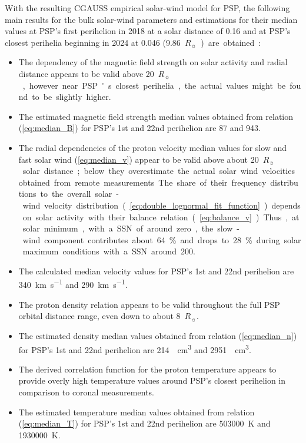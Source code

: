 \documentclass[]{aa}
\newcommand{\Rs}{$R_\sun{}$}
\begin{document}
        With the resulting CGAUSS empirical solar-wind model for PSP, the following main results for the bulk solar-wind parameters and estimations for their median values at PSP’s first perihelion in 2018 at a solar distance of \SI{0.16}{\au} and at PSP’s closest perihelia beginning in 2024 at \SI{0.046}{\au} (\SI{9.86}{\Rs}) are obtained:
        \begin{itemize}
                \item The dependency of the magnetic field strength on solar activity and radial distance appears to be valid above \SI{20}{\Rs}, however near PSP's closest perihelia, the actual values might be found to be slightly higher.
                \item The estimated magnetic field strength median values obtained from relation (\ref{eq:median_B}) for PSP's 1st and 22nd perihelion are \SI{87}{\nT} and \SI{943}{\nT}.
                \item The radial dependencies of the proton velocity median values for slow and fast solar wind (\ref{eq:median_v}) appear to be valid above about \SI{20}{\Rs} solar distance; below they overestimate the actual solar wind velocities obtained from remote measurements. The share of their frequency distributions to the overall solar-wind velocity distribution (\ref{eq:double_lognormal_fit_function}) depends on solar activity with their balance relation (\ref{eq:balance_v}). Thus, at solar minimum, with a SSN of around zero, the slow-wind component contributes about \SI{64}{\%} and drops to \SI{28}{\%} during solar maximum conditions with a SSN around 200.
                \item The calculated median velocity values for PSP's 1st and 22nd perihelion are \SI{340}{\km\per\s} and \SI{290}{\km\per\s}.
                \item The proton density relation appears to be valid throughout the full PSP orbital distance range, even down to about \SI{8}{\Rs}.
                \item The estimated density median values obtained from relation (\ref{eq:median_n}) for PSP's 1st and 22nd perihelion are \SI{214}{\per\cm\cubed} and \SI{2951}{\per\cm\cubed}.
                \item The derived correlation function for the proton temperature appears to provide overly high temperature values around PSP’s closest perihelion in comparison to coronal measurements.
                \item The estimated temperature median values obtained from relation (\ref{eq:median_T}) for PSP's 1st and 22nd perihelion are \SI{503000}{\K} and \SI{1930000}{\K}.
        \end{itemize}
\end{document}
